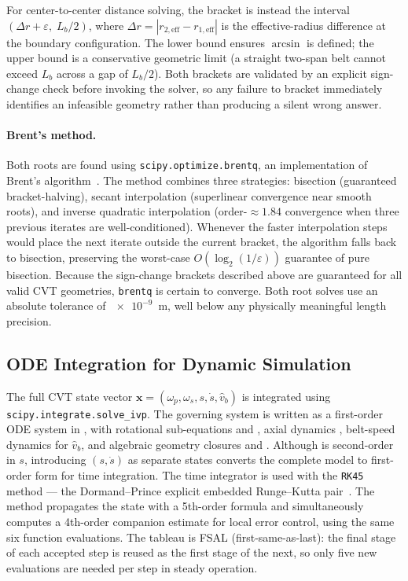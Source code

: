 \documentclass[11pt]{article}
\numberwithin{equation}{section}
\begin{document}
For center-to-center distance solving, the bracket is instead the interval
$(\Delta r + \varepsilon,\; L_b/2)$, where $\Delta r = |r_{2,\mathrm{eff}} -
r_{1,\mathrm{eff}}|$ is the effective-radius difference at the boundary
configuration. The lower bound ensures $\arcsin$ is defined; the upper bound
is a conservative geometric limit (a straight two-span belt cannot exceed
$L_b$ across a gap of $L_b/2$). Both brackets are validated by an explicit
sign-change check before invoking the solver, so any failure to bracket
immediately identifies an infeasible geometry rather than producing a silent
wrong answer.

\paragraph{Brent's method.}

Both roots are found using \texttt{scipy.optimize.brentq}, an implementation
of Brent's algorithm~\cite{Brent1973}. The method combines three strategies:
bisection (guaranteed bracket-halving), secant interpolation (superlinear
convergence near smooth roots), and inverse quadratic interpolation
(order-$\approx 1.84$ convergence when three previous iterates are
well-conditioned). Whenever the faster interpolation steps would place the
next iterate outside the current bracket, the algorithm falls back to
bisection, preserving the worst-case $O(\log_2(1/\varepsilon))$ guarantee of
pure bisection. Because the sign-change brackets described above are
guaranteed for all valid CVT geometries, \texttt{brentq} is certain to
converge. Both root solves use an absolute tolerance of $\num{e-9}$~m, well
below any physically meaningful length precision.

\subsection{ODE Integration for Dynamic Simulation}

The full CVT state vector $\mathbf{x} = (\omega_p, \omega_s, s, \dot{s}, \hat v_b)$
is integrated using \texttt{scipy.integrate.solve\_ivp}. The governing system
is written as a first-order ODE system in ,
with rotational sub-equations  and
, axial dynamics , belt-speed
dynamics for $\hat v_b$, and algebraic geometry closures
 and . Although
 is second-order in $s$, introducing $(s,\dot s)$ as
separate states converts the complete model to first-order form for time integration. The
time integrator is used with the
\texttt{RK45} method --- the Dormand--Prince explicit embedded Runge--Kutta
pair~\cite{DormandPrince1980}. The method propagates the state with a
5th-order formula and simultaneously computes a 4th-order companion estimate
for local error control, using the same six function evaluations. The tableau
is FSAL (first-same-as-last): the final stage of each accepted step is
reused as the first stage of the next, so only five new evaluations are
needed per step in steady operation.
\end{document}
